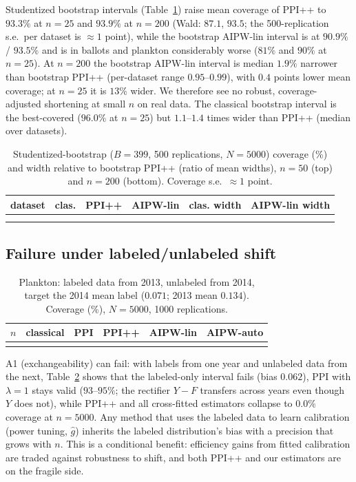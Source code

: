 \documentclass{article}
\begin{document}
Studentized bootstrap intervals (Table~\ref{tab:boot}) raise mean coverage of PPI++ to $93.3\%$ at $n=25$ and $93.9\%$ at $n=200$ (Wald: $87.1$, $93.5$; the 500-replication s.e.\ per dataset is $\approx1$ point), while the bootstrap AIPW-lin interval is at $90.9\%$ / $93.5\%$ and is in ballots and plankton considerably worse ($81\%$ and $90\%$ at $n=25$). At $n=200$ the bootstrap AIPW-lin interval is median $1.9\%$ narrower than bootstrap PPI++ (per-dataset range $0.95$--$0.99$), with $0.4$ points lower mean coverage; at $n=25$ it is $13\%$ wider. We therefore see no robust, coverage-adjusted shortening at small $n$ on real data. The classical bootstrap interval is the best-covered ($96.0\%$ at $n=25$) but $1.1$--$1.4$ times wider than PPI++ (median over datasets).

\begin{table}[t]
\caption{Studentized-bootstrap ($B=399$, 500 replications, $N=5000$) coverage (\%) and width relative to bootstrap PPI++ (ratio of mean widths), $n=50$ (top) and $n=200$ (bottom). Coverage s.e.\ $\approx1$ point.}\label{tab:boot}
\centering\small\setlength{\tabcolsep}{4pt}
\begin{tabular}{l|ccc|cc}\toprule dataset & clas. & PPI++ & AIPW-lin & clas. width & AIPW-lin width \\\midrule
\\\midrule
\\\bottomrule\end{tabular}
\end{table}

\subsection{Failure under labeled/unlabeled shift}\label{sec:shift}
\begin{table}[t]
\caption{Plankton: labeled data from 2013, unlabeled from 2014, target the 2014 mean label ($0.071$; 2013 mean $0.134$). Coverage (\%), $N=5000$, 1000 replications.}\label{tab:shift}
\centering\small\begin{tabular}{r|ccccc}\toprule $n$ & classical & PPI & PPI++ & AIPW-lin & AIPW-auto\\\midrule

\\\bottomrule\end{tabular}
\end{table}
A1 (exchangeability) can fail: with labels from one year and unlabeled data from the next, Table~\ref{tab:shift} shows that the labeled-only interval fails (bias $0.062$), PPI with $\lambda=1$ stays valid ($93$--$95\%$; the rectifier $Y-F$ transfers across years even though $Y$ does not), while PPI++ and all cross-fitted estimators collapse to $0.0\%$ coverage at $n=5000$. Any method that uses the labeled data to learn calibration (power tuning, $\hat g$) inherits the labeled distribution's bias with a precision that grows with $n$. This is a conditional benefit: efficiency gains from fitted calibration are traded against robustness to shift, and both PPI++ and our estimators are on the fragile side.
\end{document}
